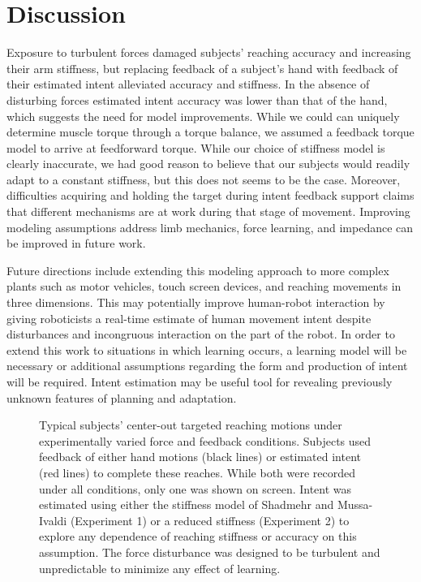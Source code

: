 \documentclass[letterpaper, 10 pt, conference]{ieeeconf}  %
\begin{document}
\section{Discussion}
Exposure to turbulent forces damaged subjects' reaching accuracy and increasing their arm stiffness, but replacing feedback of a subject's hand with feedback of their estimated intent alleviated accuracy and stiffness. In the absence of disturbing forces estimated intent accuracy was lower than that of the hand, which suggests the need for model improvements. While we could can uniquely determine muscle torque through a torque balance, we assumed a feedback torque model to arrive at feedforward torque. While our choice of stiffness model is clearly inaccurate, we had good reason to believe that our subjects would readily adapt to a constant stiffness, but this does not seems to be the case. Moreover, difficulties acquiring and holding the target during intent feedback support claims that different mechanisms are at work during that stage of movement\cite{niu2010temporal}. Improving modeling assumptions address limb mechanics, force learning, and impedance can be improved in future work.

Future directions include extending this modeling approach to more complex plants such as motor vehicles, touch screen devices, and reaching movements in three dimensions. This may potentially improve human-robot interaction by giving roboticists a real-time estimate of human movement intent despite disturbances and incongruous interaction on the part of the robot. In order to extend this work to situations in which learning occurs, a learning model will be necessary or additional assumptions regarding the form and production of intent will be required. Intent estimation may be useful tool for revealing previously unknown features of planning and adaptation.

\begin{figure}[thpb]
      \centering
      \caption{Typical subjects' center-out targeted reaching motions under experimentally varied force and feedback conditions. Subjects used feedback of either hand motions (black lines) or estimated intent (red lines) to complete these reaches. While both were recorded under all conditions, only one was shown on screen. Intent was estimated using either the stiffness model of Shadmehr and Mussa-Ivaldi (Experiment 1) or a reduced stiffness (Experiment 2) to explore any dependence of reaching stiffness or accuracy on this assumption. The force disturbance was designed to be turbulent and unpredictable to minimize any effect of learning.}
      \label{typicalsubject}
   \end{figure}
   
\end{document}
